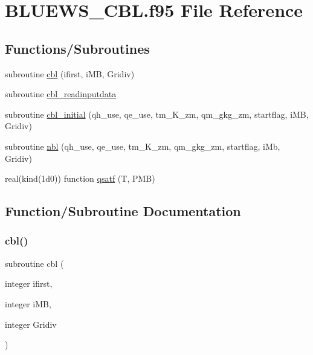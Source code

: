 \hypertarget{_b_l_u_e_w_s___c_b_l_8f95}{}\section{B\+L\+U\+E\+W\+S\+\_\+\+C\+B\+L.\+f95 File Reference}
\label{_b_l_u_e_w_s___c_b_l_8f95}
\subsection*{Functions/\+Subroutines}
\begin{DoxyCompactItemize}
\item 
subroutine \hyperlink{_b_l_u_e_w_s___c_b_l_8f95_acde23a276c692f0ec2a493dc9720471c}{cbl} (ifirst, i\+MB, Gridiv)
\item 
subroutine \hyperlink{_b_l_u_e_w_s___c_b_l_8f95_a2b7c9b5778366f3415268e6939cab229}{cbl\+\_\+readinputdata}
\item 
subroutine \hyperlink{_b_l_u_e_w_s___c_b_l_8f95_a2070c594a28f66b5ee4b95cd0251621e}{cbl\+\_\+initial} (qh\+\_\+use, qe\+\_\+use, tm\+\_\+\+K\+\_\+zm, qm\+\_\+gkg\+\_\+zm, startflag, i\+MB, Gridiv)
\item 
subroutine \hyperlink{_b_l_u_e_w_s___c_b_l_8f95_ada6e5e5cd6b578659b196bb8c26bd98c}{nbl} (qh\+\_\+use, qe\+\_\+use, tm\+\_\+\+K\+\_\+zm, qm\+\_\+gkg\+\_\+zm, startflag, i\+Mb, Gridiv)
\item 
real(kind(1d0)) function \hyperlink{_b_l_u_e_w_s___c_b_l_8f95_a67036afb2f40fef682aefc6df6d0c311}{qsatf} (T, P\+MB)
\end{DoxyCompactItemize}


\subsection{Function/\+Subroutine Documentation}
\mbox{\label{_b_l_u_e_w_s___c_b_l_8f95_acde23a276c692f0ec2a493dc9720471c}} 
\subsubsection{\texorpdfstring{cbl()}{cbl()}}
{\footnotesize\ttfamily subroutine cbl (\begin{DoxyParamCaption}\item[{integer}]{ifirst,  }\item[{integer}]{i\+MB,  }\item[{integer}]{Gridiv }\end{DoxyParamCaption})}



